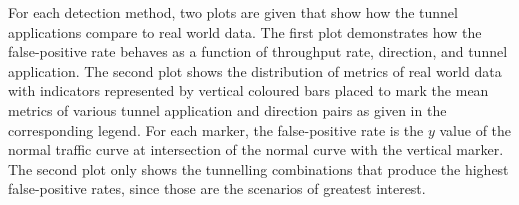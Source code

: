 \documentclass[12pt]{report}
\theoremstyle{remark}
\theoremstyle{definition}
\theoremstyle{definition}
\theoremstyle{definition}
\begin{document}
For each detection method, two plots are given that show how the tunnel
applications compare to real world data. The first plot demonstrates how the
false-positive rate behaves as a function of throughput rate, direction, and
tunnel application. The second plot shows the distribution of metrics of real
world data with indicators represented by vertical coloured bars placed to mark
the mean metrics of various tunnel application and direction pairs as given in
the corresponding legend. For each marker, the false-positive rate is the $y$
value of the normal traffic curve at intersection of the normal curve with the
vertical marker. The second plot only shows the tunnelling combinations that
produce the highest false-positive rates, since those are the scenarios of
greatest interest.

%
\end{document}
